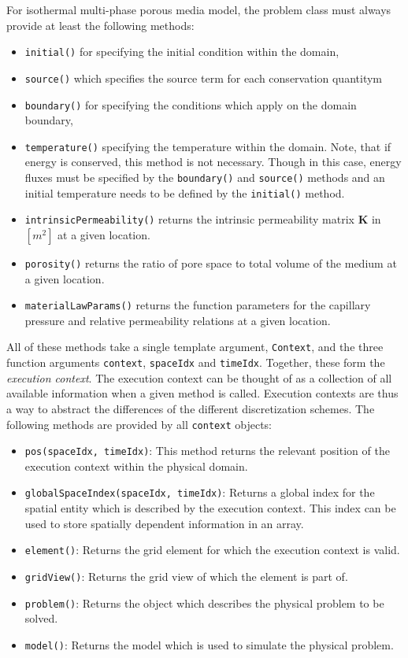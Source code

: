 For isothermal multi-phase porous media model, the problem class must
always provide at least the following methods:
\begin{itemize}
\item \texttt{initial()} for specifying the initial condition within
  the domain,
\item \texttt{source()} which specifies the source term for each conservation quantitym
\item \texttt{boundary()} for specifying the conditions which apply on
  the domain boundary,
\item \texttt{temperature()} specifying the temperature within the
  domain. Note, that if energy is conserved, this method is not
  necessary. Though in this case, energy fluxes must be specified by
  the \texttt{boundary()} and \texttt{source()} methods and an initial
  temperature needs to be defined by the \texttt{initial()} method.
\item \texttt{intrinsicPermeability()} returns the intrinsic
  permeability matrix $\mathbf{K}$ in $[m^2]$ at a given location.
\item \texttt{porosity()} returns the ratio of pore space to
  total volume of the medium at a given location.
\item \texttt{materialLawParams()} returns the function parameters for
  the capillary pressure and relative permeability relations at a
  given location.
\end{itemize}

All of these methods take a single template argument,
\texttt{Context}, and the three function arguments \texttt{context},
\texttt{spaceIdx} and \texttt{timeIdx}. Together, these form the
\textit{execution context}. The execution context can be thought of as
a collection of all available information when a given method is
called. Execution contexts are thus a way to abstract the differences
of the different discretization schemes. The following methods are
provided by all \texttt{context} objects:
\begin{itemize}
\item \texttt{pos(spaceIdx, timeIdx)}: This method returns the
  relevant position of the execution context within the physical
  domain.
\item \texttt{globalSpaceIndex(spaceIdx, timeIdx)}: Returns a global
  index for the spatial entity which is described by the execution
  context. This index can be used to store spatially dependent
  information in an array.
\item \texttt{element()}: Returns the \Dune grid element for which the
  execution context is valid.
\item \texttt{gridView()}: Returns the \Dune grid view of which the
  element is part of.
\item \texttt{problem()}: Returns the \eWoms object which describes
  the physical problem to be solved.
\item \texttt{model()}: Returns the \eWoms model which is used to simulate
  the physical problem.
\end{itemize}


